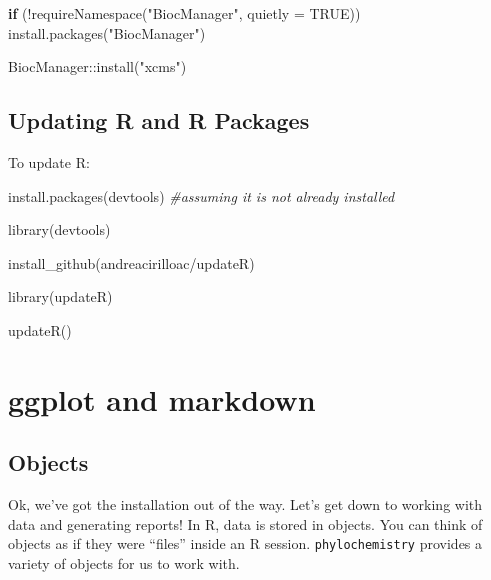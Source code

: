 \documentclass[
]{krantz}
\newenvironment{Shaded}{\begin{snugshade}}{\end{snugshade}}
\newcommand{\AttributeTok}[1]{\textcolor[rgb]{0.77,0.63,0.00}{#1}}
\newcommand{\CommentTok}[1]{\textcolor[rgb]{0.56,0.35,0.01}{\textit{#1}}}
\newcommand{\ConstantTok}[1]{\textcolor[rgb]{0.00,0.00,0.00}{#1}}
\newcommand{\ControlFlowTok}[1]{\textcolor[rgb]{0.13,0.29,0.53}{\textbf{#1}}}
\newcommand{\FunctionTok}[1]{\textcolor[rgb]{0.00,0.00,0.00}{#1}}
\newcommand{\NormalTok}[1]{#1}
\newcommand{\SpecialCharTok}[1]{\textcolor[rgb]{0.00,0.00,0.00}{#1}}
\newcommand{\StringTok}[1]{\textcolor[rgb]{0.31,0.60,0.02}{#1}}
\begin{document}
\begin{Shaded}
\begin{Highlighting}[]
\ControlFlowTok{if}\NormalTok{ (}\SpecialCharTok{!}\FunctionTok{requireNamespace}\NormalTok{(}\StringTok{"BiocManager"}\NormalTok{, }\AttributeTok{quietly =} \ConstantTok{TRUE}\NormalTok{))}
    \FunctionTok{install.packages}\NormalTok{(}\StringTok{"BiocManager"}\NormalTok{)}

\NormalTok{BiocManager}\SpecialCharTok{::}\FunctionTok{install}\NormalTok{(}\StringTok{"xcms"}\NormalTok{)}
\end{Highlighting}
\end{Shaded}

\hypertarget{updating-r-and-r-packages}{%
\subsection{Updating R and R Packages}\label{updating-r-and-r-packages}}

To update R:

\begin{Shaded}
\begin{Highlighting}[]

\FunctionTok{install.packages}\NormalTok{(}\StringTok{\textquotesingle{}devtools\textquotesingle{}}\NormalTok{) }\CommentTok{\#assuming it is not already installed}

\FunctionTok{library}\NormalTok{(devtools)}

\FunctionTok{install\_github}\NormalTok{(}\StringTok{\textquotesingle{}andreacirilloac/updateR\textquotesingle{}}\NormalTok{)}

\FunctionTok{library}\NormalTok{(updateR)}

\FunctionTok{updateR}\NormalTok{()}
\end{Highlighting}
\end{Shaded}

\hypertarget{ggplot-and-markdown}{%
\section*{ggplot and markdown}\label{ggplot-and-markdown}}

\hypertarget{objects}{%
\subsection{Objects}\label{objects}}

Ok, we've got the installation out of the way. Let's get down to working with data and generating reports! In R, data is stored in objects. You can think of objects as if they were ``files'' inside an R session. \texttt{phylochemistry} provides a variety of objects for us to work with.
\end{document}
